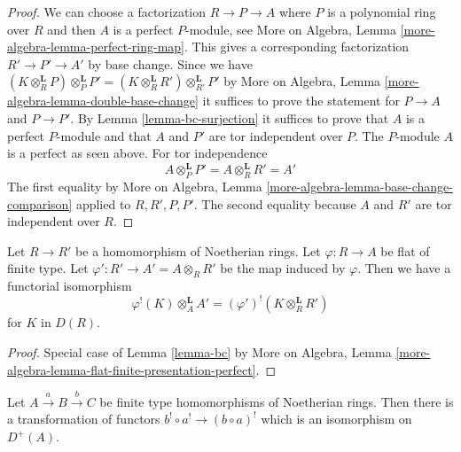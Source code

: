 \begin{proof}
We can choose a factorization $R \to P \to A$ where $P$ is a polynomial
ring over $R$ and then $A$ is a perfect $P$-module, see
More on Algebra, Lemma \ref{more-algebra-lemma-perfect-ring-map}.
This gives a corresponding factorization
$R' \to P' \to A'$ by base change. Since we have
$(K \otimes_R^\mathbf{L} P) \otimes_P^\mathbf{L} P' =
(K \otimes_R^\mathbf{L} R') \otimes_{R'}^\mathbf{L} P'$
by More on Algebra, Lemma \ref{more-algebra-lemma-double-base-change}
it suffices to prove the statement for
$P \to A$ and $P \to P'$.
By Lemma \ref{lemma-bc-surjection}
it suffices to prove that $A$ is a perfect $P$-module
and that $A$ and $P'$ are tor independent over $P$.
The $P$-module $A$ is a perfect as seen above.
For tor independence
$$
A \otimes_P^\mathbf{L} P' = A \otimes_R^\mathbf{L} R' = A'
$$
The first equality by
More on Algebra, Lemma \ref{more-algebra-lemma-base-change-comparison}
applied to $R, R', P, P'$. The second equality because
$A$ and $R'$ are tor independent over $R$.
\end{proof}

\begin{lemma}
\label{lemma-bc-flat}
Let $R \to R'$ be a homomorphism of Noetherian rings.
Let $\varphi : R \to A$ be flat of finite type.
Let $\varphi' : R' \to A' = A \otimes_R R'$ be the map induced by $\varphi$.
Then we have a functorial isomorphism
$$
\varphi^!(K) \otimes_A^\mathbf{L} A' =
(\varphi')^!(K \otimes_R^\mathbf{L} R')
$$
for $K$ in $D(R)$.
\end{lemma}

\begin{proof}
Special case of Lemma \ref{lemma-bc} by
More on Algebra, Lemma
\ref{more-algebra-lemma-flat-finite-presentation-perfect}.
\end{proof}

\begin{lemma}
\label{lemma-composition-shriek-algebraic}
Let $A \xrightarrow{a} B \xrightarrow{b} C$ be finite type homomorphisms of
Noetherian rings. Then there is a transformation of functors
$b^! \circ a^! \to (b \circ a)^!$ which is an isomorphism on $D^+(A)$.
\end{lemma}

